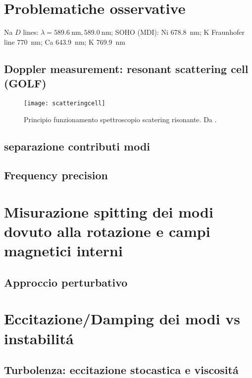 \documentclass[../main.tex]{subfiles}
\begin{document}
\begin{refsection}

\nocite{*}
\begingroup
\let\clearpage\relax
\printbibliography
\endgroup

\section{Problematiche osservative}

Na $D$ lines: $\lambda=\SI{589.6}{\nano\meter},\SI{589.0}{\nano\meter}$; SOHO (MDI): Ni \SI{678.8}{\nano\meter}; K Fraunhofer line \SI{770}{\nano\meter}; Ca \SI{643.9}{\nano\meter}; K \SI{769.9}{\nano\meter}

\subsection{Doppler measurement: resonant scattering cell (GOLF)}

\begin{wrapfigure}{r}{0.5\textwidth}
\centering
\texttt{[image: scatteringcell]}
\caption{Principio funzionamento spettroscopio scatering risonante. Da \cite{brookes1978resonant}.}
\end{wrapfigure}

\subsection{separazione contributi modi}
\subsection{Frequency precision}

\section{Misurazione spitting dei modi dovuto alla rotazione e campi magnetici interni}

\subsection{Approccio perturbativo}

\section{Eccitazione/Damping dei modi vs instabilit\'a}

\subsection{Turbolenza: eccitazione stocastica e viscosit\'a}

\end{refsection}
\end{document}

